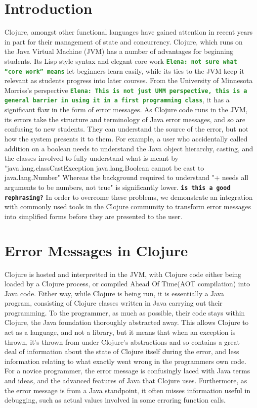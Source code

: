 \documentclass[12pt]{article}
\newcommand{\comment}[1]{{\bf \tt  {#1}}}
\newcommand{\emcomment}[1]{\textcolor{ForestGreen}{\comment{Elena: {#1}}}}
\begin{document}
\section{Introduction}
Clojure, amongst other functional languages have gained attention in recent years
in part for their management of state and concurrency.
Clojure, which runs on the Java Virtual Machine (JVM) has a number of advantages for beginning students.
Its Lisp style syntax and elegant core work \emcomment{not sure what ``core work'' means}
 let beginners learn easily, while
its ties to the JVM keep it relevant as students progress into later courses.
From the University of Minnesota Morriss's perspective
\emcomment{This is not just UMM perspective, this is a general barrier in using it in a first programming class}, it has a significant flaw in the form of error messages.
As Clojure code runs in the JVM, its errors take the structure and terminology of Java error messages,
and so are confusing to new students. They can understand the source of the error,
but not how the system presents it to them.
For example, a user who accidentally called addition on a boolean needs
 to understand the Java object hierarchy, casting,
 and the classes involved to fully understand what is meant by
 "java.lang.classCastException java.lang.Boolean cannot be cast to java.lang.Number"
Whereas the background required to understand "+ needs all arguments to be numbers, not true"
 is significantly lower. \comment{is this a good rephrasing?}
 In order to overcome these problems,
  we demonstrate an integration with commonly used tools in the Clojure community
 to transform error messages into simplified forms before they are presented to the user.

\cite{Hickey:2008}

\section{Error Messages in Clojure}
Clojure is hosted and interpretted in the JVM, with Clojure code either being
loaded by a Clojure process, or compiled Ahead Of Time(AOT compilation) into Java code.
Either way, while Clojure is being run, it is essentially a Java program, consisting of
Clojure classes written in Java carrying out their programming.
To the programmer, as much as possible, their code stays within Clojure,
the Java foundation thoroughly abstracted away.
This allows Clojure to act as a language, and not a library, but it means
 that when an exception is thrown, it's thrown from under Clojure's abstractions
 and so contains a great deal of information about the state of Clojure itself
 during the error, and less information relating to what exactly went wrong in the
 programmers own code.
 For a novice programmer, the error message is confusingly laced
  with Java terms and ideas, and the advanced features of Java that Clojure uses.
  Furthermore, as the error message is from a Java standpoint, it often misses
  information useful in debugging, such as actual values involved in some erroring function calls.
\end{document}
